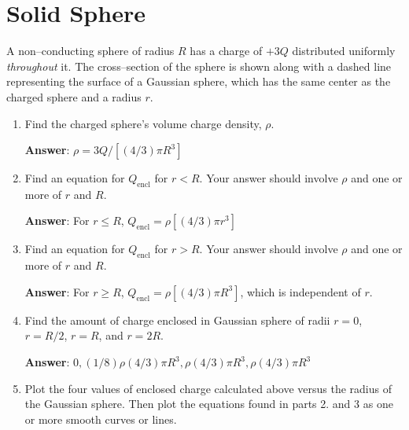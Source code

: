 \documentclass{article}
\newcommand{\ds}[0]{\displaystyle}
\begin{document}
\newpage

\section{Solid Sphere}

A non--conducting sphere of radius $R$ has a charge of $+3Q$ distributed uniformly \emph{throughout} it. The cross--section of the sphere is shown along with a dashed line representing the surface of a Gaussian sphere, which has the same center as the charged sphere and a radius $r$.



\begin{enumerate}

  \item Find the charged sphere's volume charge density, $\rho$.

        \ifsolutions
        {\bf Answer}: $\ds \rho=3Q/[(4/3)\pi R^3]$
        \fi

        \ifsolutions\else
        \vskip 36pt
        \fi

  \item Find an equation for $Q_{\text{encl}}$ for $r<R$. Your answer should involve $\rho$ and one or more of $r$ and $R$.

        \ifsolutions
        {\bf Answer}: For $r \le R$, $Q_{\text{encl}}=\rho [(4/3)\pi r^3]$
        \fi

        \ifsolutions\else
        \vskip 36pt
        \fi

  \item Find an equation for $Q_{\text{encl}}$ for $r>R$. Your answer should involve $\rho$ and one or more of $r$ and $R$.

        \ifsolutions
        {\bf Answer}: For $r \ge R$,  $Q_{\text{encl}}=\rho [(4/3)\pi R^3]$, which is independent of $r$.
        \fi

        \ifsolutions\else
        \vskip 36pt
        \fi

  \item Find the amount of charge enclosed in Gaussian sphere of radii $r=0$, $r=R/2$, $r=R$, and $r=2R$.

        \ifsolutions
        {\bf Answer}: $0, (1/8)\rho (4/3)\pi R^3, \rho(4/3)\pi R^3, \rho(4/3)\pi R^3$
        \fi

        \ifsolutions\else
        \vskip 36pt
        \fi

  \item Plot the four values of enclosed charge calculated above versus the radius of the Gaussian sphere. Then plot the equations found in parts 2. and 3 as one or more smooth curves or lines.

        \ifsolutions
        
        \fi

\end{enumerate}
\end{document}
